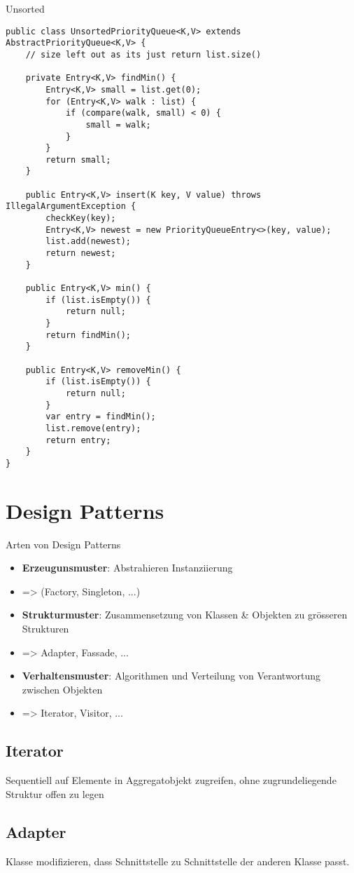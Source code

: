 \begin{multicols*}{4}
	Unsorted
	\begin{lstlisting}
public class UnsortedPriorityQueue<K,V> extends AbstractPriorityQueue<K,V> {
	// size left out as its just return list.size()
	
	private Entry<K,V> findMin() {
		Entry<K,V> small = list.get(0);
		for (Entry<K,V> walk : list) {
			if (compare(walk, small) < 0) {
				small = walk;
			}
		}
		return small;
	}
	
	public Entry<K,V> insert(K key, V value) throws IllegalArgumentException {
		checkKey(key);
		Entry<K,V> newest = new PriorityQueueEntry<>(key, value);
		list.add(newest);
		return newest;
	}

	public Entry<K,V> min() {
		if (list.isEmpty()) {
			return null;
		}
		return findMin();
	}

	public Entry<K,V> removeMin() {
		if (list.isEmpty()) {
			return null;
		}
		var entry = findMin();
		list.remove(entry);
		return entry;
	}
}
	\end{lstlisting}

\section{Design Patterns}
	Arten von Design Patterns
	\begin{itemize}
		\item \textbf{Erzeugunsmuster}: Abstrahieren Instanziierung 
		\item => (Factory, Singleton, ...)
		\item \textbf{Strukturmuster}: Zusammensetzung von Klassen \& Objekten zu grösseren Strukturen
		\item => Adapter, Fassade, ...
		\item \textbf{Verhaltensmuster}: Algorithmen und Verteilung von Verantwortung zwischen Objekten
		\item => Iterator, Visitor, ...
	\end{itemize}
	\subsection{Iterator}
	Sequentiell auf Elemente in Aggregatobjekt zugreifen, ohne zugrundeliegende Struktur offen zu legen
	
	\subsection{Adapter}
	Klasse modifizieren, dass Schnittstelle zu Schnittstelle der anderen Klasse passt.
	

\end{multicols*}
